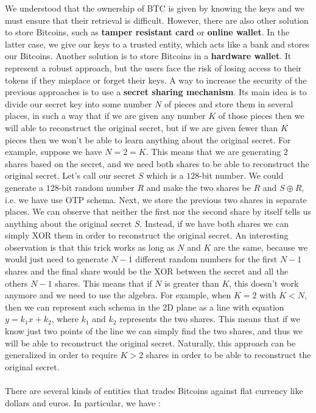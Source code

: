 We understood that the ownership of BTC is given by knowing the keys and we must ensure that their retrieval is difficult. However, there are also other solution to store Bitcoins, such as \textbf{tamper resistant card} or \textbf{online wallet}. In the latter case, we give our keys to a trusted entity, which acts like a bank and stores our Bitcoins. Another solution is to store Bitcoins in a \textbf{hardware wallet}. It represent a robust approach, but the users face the risk of losing access to their tokens if they misplace or forget their keys. A way to increase the security of the previous approaches is to use a \textbf{secret sharing mechanism}. Its main idea is to divide our secret key into some number $N$ of pieces and store them in several places, in such a way that if we are given any number $K$ of those pieces then we will able to reconstruct the original secret, but if we are given fewer than $K$ pieces then we won't be able to learn anything about the original secret. For example, suppose we have $N = 2 = K$. This means that we are generating $2$ shares based on the secret, and we need both shares to be able to reconstruct the original secret. Let's call our secret $S$ which is a $128$-bit number. We could generate a $128$-bit random number $R$ and make the two shares be $R$ and $S \oplus R$, i.e. we have use OTP schema. Next, we store the previous two shares in separate places. We can observe that neither the first nor the second share by itself tells us anything about the original secret $S$. Instead, if we have both shares we can simply XOR them in order to reconstruct the original secret. An interesting observation is that this trick works as long as $N$ and $K$ are the same, because we would just need to generate $N - 1$ different random numbers for the first $N - 1$ shares and the final share would be the XOR between the secret and all the others $N - 1$ shares. This means that if $N$ is greater than $K$, this doesn't work anymore and we need to use the algebra. For example, when $K = 2$ with $K < N$, then we can represent such schema in the 2D plane as a line with equation $y = k_{1}x + k_{2}$, where $k_{1}$ and $k_{2}$ represents the two shares. This means that if we know just two points of the line we can simply find the two shares, and thus we will be able to reconstruct the original secret. Naturally, this approach can be generalized in order to require $K > 2$ shares in order to be able to reconstruct the original secret.\\\\There are several kinds of entities that trades Bitcoins against flat currency like dollars and euros. In particular, we have :
